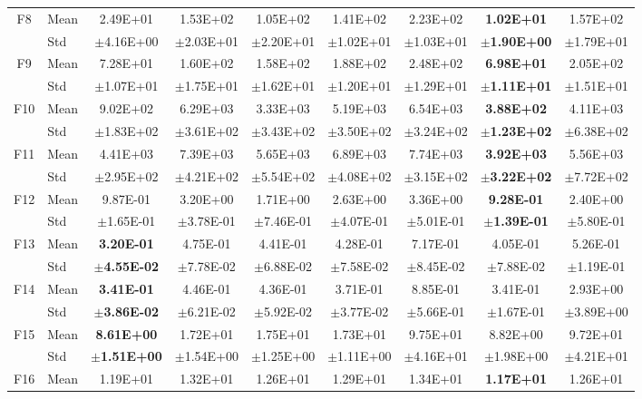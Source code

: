 \begin{table}[htbp]
{\begin{tabular}{clccccccc}
F8 & Mean & 2.49E+01 & 1.53E+02 & 1.05E+02 & 1.41E+02 & 2.23E+02 & \textbf{1.02E+01} & 1.57E+02 \\
 & Std & $\pm$4.16E+00 & $\pm$2.03E+01 & $\pm$2.20E+01 & $\pm$1.02E+01 & $\pm$1.03E+01 & $\pm$\textbf{1.90E+00} & $\pm$1.79E+01 \\
F9 & Mean & 7.28E+01 & 1.60E+02 & 1.58E+02 & 1.88E+02 & 2.48E+02 & \textbf{6.98E+01} & 2.05E+02 \\
 & Std & $\pm$1.07E+01 & $\pm$1.75E+01 & $\pm$1.62E+01 & $\pm$1.20E+01 & $\pm$1.29E+01 & $\pm$\textbf{1.11E+01} & $\pm$1.51E+01 \\
F10 & Mean & 9.02E+02 & 6.29E+03 & 3.33E+03 & 5.19E+03 & 6.54E+03 & \textbf{3.88E+02} & 4.11E+03 \\
 & Std & $\pm$1.83E+02 & $\pm$3.61E+02 & $\pm$3.43E+02 & $\pm$3.50E+02 & $\pm$3.24E+02 & $\pm$\textbf{1.23E+02} & $\pm$6.38E+02 \\
F11 & Mean & 4.41E+03 & 7.39E+03 & 5.65E+03 & 6.89E+03 & 7.74E+03 & \textbf{3.92E+03} & 5.56E+03 \\
 & Std & $\pm$2.95E+02 & $\pm$4.21E+02 & $\pm$5.54E+02 & $\pm$4.08E+02 & $\pm$3.15E+02 & $\pm$\textbf{3.22E+02} & $\pm$7.72E+02 \\
F12 & Mean & 9.87E-01 & 3.20E+00 & 1.71E+00 & 2.63E+00 & 3.36E+00 & \textbf{9.28E-01} & 2.40E+00 \\
 & Std & $\pm$1.65E-01 & $\pm$3.78E-01 & $\pm$7.46E-01 & $\pm$4.07E-01 & $\pm$5.01E-01 & $\pm$\textbf{1.39E-01} & $\pm$5.80E-01 \\
F13 & Mean & \textbf{3.20E-01} & 4.75E-01 & 4.41E-01 & 4.28E-01 & 7.17E-01 & 4.05E-01 & 5.26E-01 \\
 & Std & $\pm$\textbf{4.55E-02} & $\pm$7.78E-02 & $\pm$6.88E-02 & $\pm$7.58E-02 & $\pm$8.45E-02 & $\pm$7.88E-02 & $\pm$1.19E-01 \\
F14 & Mean & \textbf{3.41E-01} & 4.46E-01 & 4.36E-01 & 3.71E-01 & 8.85E-01 & 3.41E-01 & 2.93E+00 \\
 & Std & $\pm$\textbf{3.86E-02} & $\pm$6.21E-02 & $\pm$5.92E-02 & $\pm$3.77E-02 & $\pm$5.66E-01 & $\pm$1.67E-01 & $\pm$3.89E+00 \\
F15 & Mean & \textbf{8.61E+00} & 1.72E+01 & 1.75E+01 & 1.73E+01 & 9.75E+01 & 8.82E+00 & 9.72E+01 \\
 & Std & $\pm$\textbf{1.51E+00} & $\pm$1.54E+00 & $\pm$1.25E+00 & $\pm$1.11E+00 & $\pm$4.16E+01 & $\pm$1.98E+00 & $\pm$4.21E+01 \\
F16 & Mean & 1.19E+01 & 1.32E+01 & 1.26E+01 & 1.29E+01 & 1.34E+01 & \textbf{1.17E+01} & 1.26E+01 \\

\end{tabular}}
\end{table}
